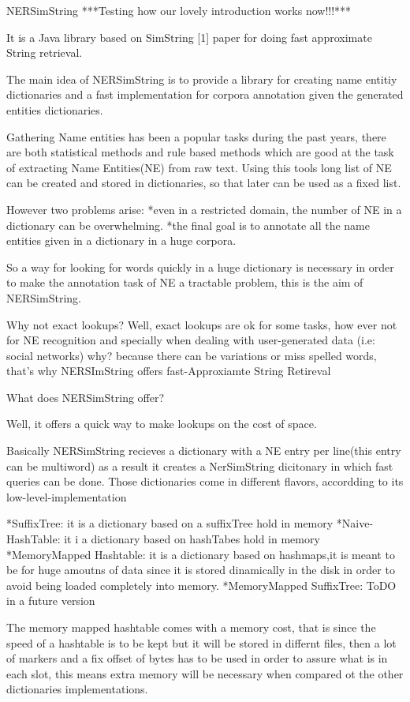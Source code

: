 NERSimString 
***Testing how our lovely introduction works now!!!*** 

It is a Java library based on SimString [1] paper for doing fast approximate String retrieval.

The main idea of NERSimString is to provide a library for creating name entitiy dictionaries
and a fast implementation for corpora annotation given the generated entities dictionaries.

Gathering Name entities has been a popular tasks during the past years,
 there are  both statistical methods and rule based methods which are good at the task of extracting Name Entities(NE)
from raw text.
Using this tools long list of NE can be created and stored in dictionaries, so that later can be used as a fixed list.

However two problems arise:
 *even in a restricted domain, the number of NE in a dictionary can be overwhelming.
 *the final goal is to annotate all the name entities given in a dictionary in  a huge corpora.

So a way for looking for words quickly in a huge dictionary is  necessary in order to make the annotation task of NE a tractable problem, 
this is the aim of NERSimString.

Why not exact lookups?
Well, exact lookups are ok for some tasks, how ever not for NE recognition and specially when dealing
with user-generated data (i.e: social networks) why? because there can be variations or miss spelled words,
that's why NERSImString offers fast-Approxiamte String Retireval

What does NERSimString offer?

Well, it offers a quick way to make lookups on the cost of space.

Basically NERSimString recieves a dictionary with a NE entry per line(this entry can be multiword)
as a result it creates a NerSimString dicitonary in which fast queries can be done.
Those dictionaries come in different flavors, accordding to its low-level-implementation


	*SuffixTree: it is a dictionary based on a suffixTree hold in memory
	*Naive-HashTable: it i a dictionary based on hashTabes hold in memory
	*MemoryMapped Hashtable: it is a dictionary based on hashmaps,it is meant to be for huge amoutns of data since it is stored dinamically in the disk
				 in order to avoid being loaded completely into memory.
	*MemoryMapped SuffixTree: ToDO in a future version

The memory mapped hashtable comes with a memory cost, that is since the speed of  a hashtable is to be kept but it will be stored in differnt files, then a lot of markers and a fix offset of bytes has to be used in order to assure what is in each slot, this means extra memory will be necessary when compared ot the other dictionaries implementations.

